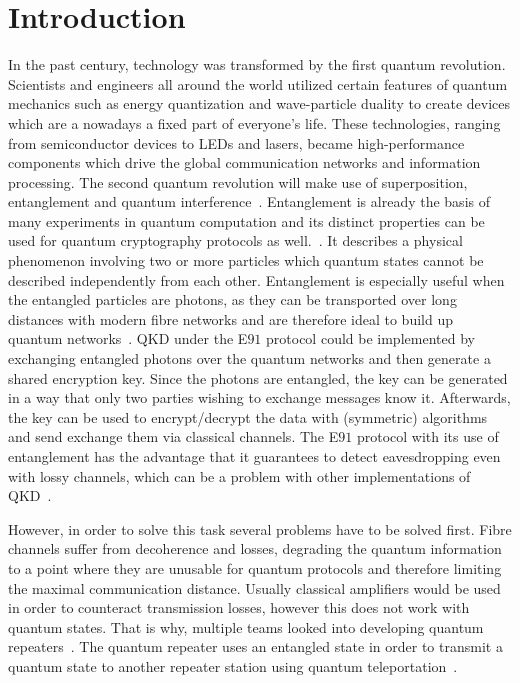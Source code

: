 \chapter{Introduction}

In the past century, technology was transformed by the first quantum revolution. Scientists and engineers all around the world utilized certain features of quantum mechanics such as energy quantization and wave-particle duality to create devices which are a nowadays a fixed part of everyone's life.
These technologies, ranging from semiconductor devices to LEDs and lasers, became high-performance components which drive the global communication networks and information processing.
The second quantum revolution will make use of superposition, entanglement and quantum interference~\cite{macfarlane_quantum_2003}.
Entanglement is already the basis of many experiments in quantum computation and its distinct properties can be used for quantum cryptography protocols as well.~\cite{zeilinger_light_2017}.
It describes a physical phenomenon involving two or more particles which quantum states cannot be described independently from each other.
Entanglement is especially useful when the entangled particles are photons, as they can be transported over long distances with modern fibre networks and are therefore ideal to build up quantum networks~\cite{gisin_quantum_2002}.
\ac{QKD} under the E$91$ protocol could be implemented by exchanging entangled photons over the quantum networks and then generate a shared encryption key.
Since the photons are entangled, the key can be generated in a way that only two parties wishing to exchange messages know it.
Afterwards, the key can be used to encrypt/decrypt the data with (symmetric) algorithms and send exchange them via classical channels.
The E$91$ protocol with its use of entanglement has the advantage that it guarantees to detect eavesdropping even with lossy channels, which can be a problem with other implementations of \ac{QKD}~\cite{ekert_quantum_1991}.

However, in order to solve this task several problems have to be solved first.
Fibre channels suffer from decoherence and losses, degrading the quantum information to a point where they are unusable for quantum protocols and therefore limiting the maximal communication distance.
Usually classical amplifiers would be used in order to counteract transmission losses, however this does not work with quantum states.
That is why, multiple teams looked into developing quantum repeaters~\cite{reindl_all-photonic_2018}\cite{duan_long-distance_2001}\cite{simon_quantum_2007}.
The quantum repeater uses an entangled state in order to transmit a quantum state to another repeater station using quantum teleportation~\cite{bennett_teleporting_1993}.

